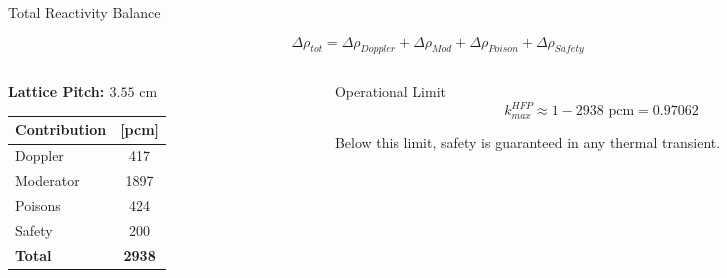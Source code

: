 \documentclass[aspectratio=169]{beamer}
\begin{document}
\begin{frame}{Total Reactivity Balance}

    \begin{equation*}
        \Delta\rho_{tot} = \Delta\rho_{Doppler} + \Delta\rho_{Mod} + \Delta\rho_{Poison} + \Delta\rho_{Safety}
    \end{equation*}

    \vspace{0.3cm}

    \begin{columns}[c]
        \begin{column}{0.45\textwidth}
            \begin{table}
                \centering
                {\small \textbf{Lattice Pitch: $3.55 \text{ cm}$}} \\[0.15cm]
                \begin{tabular}{lc}
                    \toprule
                    \textbf{Contribution} & \textbf{[pcm]} \\
                    \midrule
                    Doppler & 417 \\
                    Moderator & 1897 \\
                    Poisons & 424 \\
                    Safety & 200 \\
                    \midrule
                    \textbf{Total} & \textbf{2938} \\
                    \bottomrule
                \end{tabular}
            \end{table}
        \end{column}
        
        \begin{column}{0.5\textwidth}
            \begin{alertblock}{Operational Limit}
                \begin{equation*}
                    k_{max}^{HFP} \approx 1 - 2938 \text{ pcm} = \boxed{0.97062}
                \end{equation*}
            \end{alertblock}
            
            \vspace{0.2cm}
            
            \footnotesize Below this limit, safety is guaranteed in any thermal transient. 
        \end{column}
    \end{columns}
\end{frame} 
\end{document}
